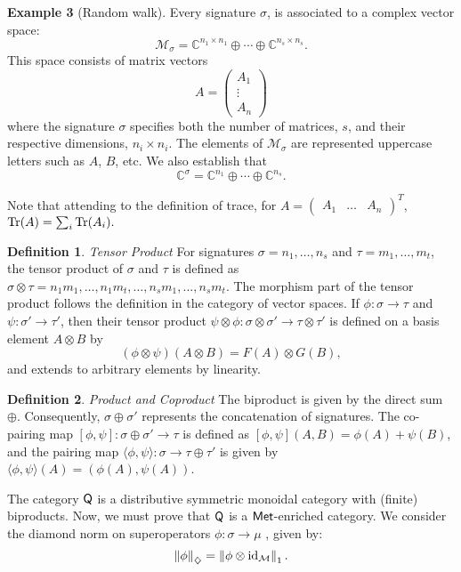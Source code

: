 \documentclass[10pt,a4paper]{amsart}
\theoremstyle{definition}
\newtheorem{definition}{Definition}[section]
\theoremstyle{definition}
\newtheorem{example}[definition]{Example}
\theoremstyle{definition}
\theoremstyle{definition}
\theoremstyle{definition}
\theoremstyle{definition}
\begin{document}
\begin{example}[Random walk]
 Every signature $\sigma$, is associated to  a complex vector space:
\[
\mathcal{M}_\sigma = \mathbb{C}^{n_1 \times n_1} \oplus \cdots \oplus \mathbb{C}^{n_s \times n_s}.
\]
This space consists of matrix vectors 
$$A = \begin{pmatrix} A_1 \\ \vdots \\ A_n \end{pmatrix}$$
where the signature $\sigma$ specifies both the number of matrices, $s$,  and their respective dimensions, $n_i \times n_i$. The elements of $\mathcal{M}_\sigma$ are represented uppercase letters such as $A$, $B$, etc.
We also establish that
\[
\mathbb{C}^\sigma = \mathbb{C}^{n_1} \oplus \cdots \oplus \mathbb{C}^{n_s}.
\]

Note that attending to the definition of trace, for $A = \begin{pmatrix} A_1 & \ldots & A_n \end{pmatrix}^T$, $\text{Tr}(A) = \sum_i \text{Tr}(A_i).$
 



\begin{definition} \label{def:tensor} \emph{Tensor Product }
  For signatures $\sigma = n_1, \ldots, n_s $ and $\tau= m_1, \ldots, m_t $, the tensor product of $\sigma$ and $\tau$ is defined as $\sigma \otimes \tau = n_1 m_1, \ldots ,n_1 m_t, \ldots, n_s m_1,...,n_s m_t$. 
  The morphism part of the tensor product follows the definition in the category of vector spaces. If $\phi: \sigma \rightarrow \tau$ and $\psi: \sigma' \rightarrow  \tau'$, then their tensor product $\psi \otimes \phi: \sigma \otimes \sigma' \rightarrow  \tau \otimes \tau' $ is defined on a basis element $A \otimes B$ by  
$$
(\phi \otimes \psi)(A \otimes B) = F(A) \otimes G(B),
$$
and extends to arbitrary elements by linearity.
\end{definition}

\begin{definition} \label{def:biproduct} \emph{Product and Coproduct}
  The biproduct is given by the direct sum $\oplus$. Consequently, $\sigma \oplus \sigma'$ represents the concatenation of signatures. The co-pairing map $[\phi, \psi]: \sigma \oplus \sigma' \to \tau$ is defined as  $[\phi, \psi](A, B) = \phi(A) + \psi(B)$, and the pairing map $\langle \phi, \psi \rangle: \sigma \to \tau \oplus \tau'$ is given by  $\langle \phi, \psi \rangle(A) = (\phi(A), \psi(A))$.
\end{definition}

The category $\mathsf{Q}$ is a distributive symmetric monoidal category with (finite) biproducts. Now, we must prove that $\mathsf{Q}$ is a $\mathsf{Met}$-enriched category. We consider the diamond norm on superoperators $\phi: \sigma \rightarrow \mu$ \cite{watrous2018theory}, given by:
 $$\left\lVert \phi \right\rVert_{\diamondsuit} = \left\lVert  \phi \otimes \mathrm{id}_{\mathcal{M}} \right\rVert_{1}.$$


\end{example}
\end{document}
